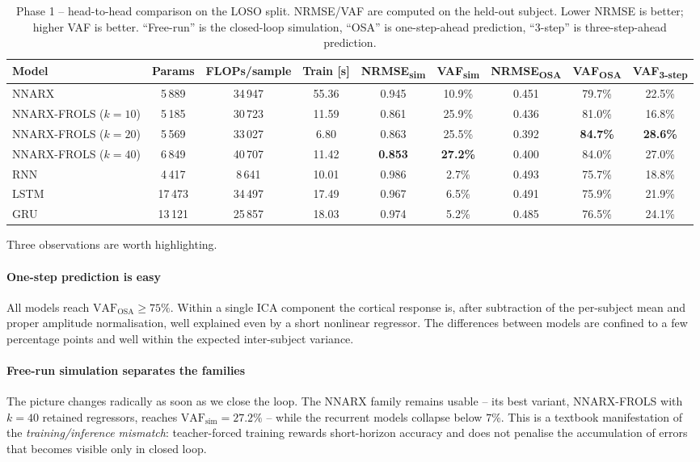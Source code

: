 \documentclass[conference]{IEEEtran}
\begin{document}
\begin{table}[t]
\centering
\caption{Phase 1 -- head-to-head comparison on the LOSO split.
NRMSE/VAF are computed on the held-out subject. Lower NRMSE is better;
higher VAF is better. ``Free-run'' is the closed-loop simulation,
``OSA'' is one-step-ahead prediction, ``3-step'' is three-step-ahead
prediction.}
\label{tab:phase1}
\begin{tabular}{lcccccccc}
\toprule
\textbf{Model} & \textbf{Params} & \textbf{FLOPs/sample} &
\textbf{Train [s]} &
\textbf{NRMSE\textsubscript{sim}} & \textbf{VAF\textsubscript{sim}} &
\textbf{NRMSE\textsubscript{OSA}} & \textbf{VAF\textsubscript{OSA}} &
\textbf{VAF\textsubscript{3-step}} \\
\midrule
NNARX           &  5\,889 & 34\,947 & 55.36 & 0.945 & 10.9\% & 0.451 & 79.7\% & 22.5\% \\
NNARX-FROLS ($k=10$) & 5\,185 & 30\,723 & 11.59 & 0.861 & 25.9\% & 0.436 & 81.0\% & 16.8\% \\
NNARX-FROLS ($k=20$) & 5\,569 & 33\,027 &  6.80 & 0.863 & 25.5\% & 0.392 & \textbf{84.7\%} & \textbf{28.6\%} \\
NNARX-FROLS ($k=40$) & 6\,849 & 40\,707 & 11.42 & \textbf{0.853} & \textbf{27.2\%} & 0.400 & 84.0\% & 27.0\% \\
RNN             &  4\,417 &  8\,641 & 10.01 & 0.986 &  2.7\% & 0.493 & 75.7\% & 18.8\% \\
LSTM            & 17\,473 & 34\,497 & 17.49 & 0.967 &  6.5\% & 0.491 & 75.9\% & 21.9\% \\
GRU             & 13\,121 & 25\,857 & 18.03 & 0.974 &  5.2\% & 0.485 & 76.5\% & 24.1\% \\
\bottomrule
\end{tabular}
\end{table}

Three observations are worth highlighting.

\paragraph{One-step prediction is easy} All models reach
$\mathrm{VAF_{OSA}}\geq 75\%$. Within a single ICA component the
cortical response is, after subtraction of the per-subject mean and
proper amplitude normalisation, well explained even by a short
nonlinear regressor. The differences between models are confined to
a few percentage points and well within the expected inter-subject
variance.

\paragraph{Free-run simulation separates the families} The picture
changes radically as soon as we close the loop. The NNARX family
remains usable -- its best variant, NNARX-FROLS with $k=40$ retained
regressors, reaches $\mathrm{VAF_{sim}}=27.2\%$ -- while the recurrent
models collapse below $7\%$. This is a textbook manifestation of the
\emph{training/inference mismatch}: teacher-forced training rewards
short-horizon accuracy and does not penalise the accumulation of
errors that becomes visible only in closed loop.
\end{document}
